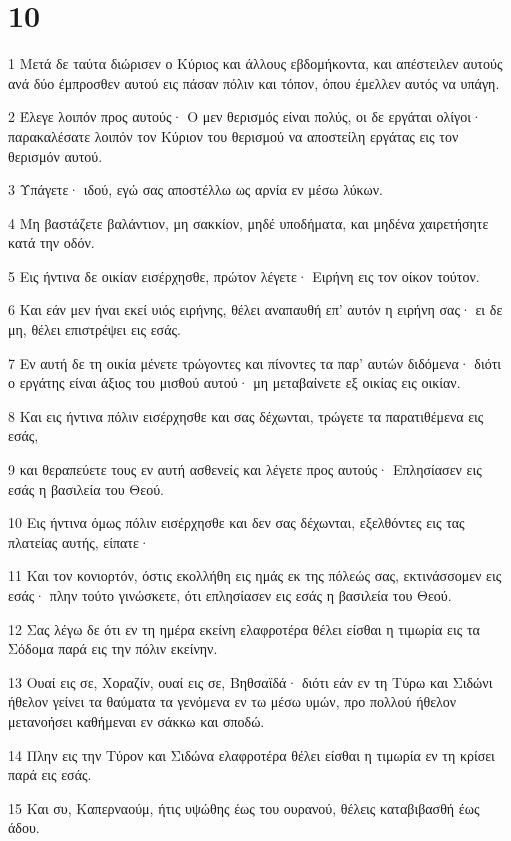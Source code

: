 \chapter{10}

\par 1 Μετά δε ταύτα διώρισεν ο Κύριος και άλλους εβδομήκοντα, και απέστειλεν αυτούς ανά δύο έμπροσθεν αυτού εις πάσαν πόλιν και τόπον, όπου έμελλεν αυτός να υπάγη.
\par 2 Έλεγε λοιπόν προς αυτούς· Ο μεν θερισμός είναι πολύς, οι δε εργάται ολίγοι· παρακαλέσατε λοιπόν τον Κύριον του θερισμού να αποστείλη εργάτας εις τον θερισμόν αυτού.
\par 3 Υπάγετε· ιδού, εγώ σας αποστέλλω ως αρνία εν μέσω λύκων.
\par 4 Μη βαστάζετε βαλάντιον, μη σακκίον, μηδέ υποδήματα, και μηδένα χαιρετήσητε κατά την οδόν.
\par 5 Εις ήντινα δε οικίαν εισέρχησθε, πρώτον λέγετε· Ειρήνη εις τον οίκον τούτον.
\par 6 Και εάν μεν ήναι εκεί υιός ειρήνης, θέλει αναπαυθή επ' αυτόν η ειρήνη σας· ει δε μη, θέλει επιστρέψει εις εσάς.
\par 7 Εν αυτή δε τη οικία μένετε τρώγοντες και πίνοντες τα παρ' αυτών διδόμενα· διότι ο εργάτης είναι άξιος του μισθού αυτού· μη μεταβαίνετε εξ οικίας εις οικίαν.
\par 8 Και εις ήντινα πόλιν εισέρχησθε και σας δέχωνται, τρώγετε τα παρατιθέμενα εις εσάς,
\par 9 και θεραπεύετε τους εν αυτή ασθενείς και λέγετε προς αυτούς· Επλησίασεν εις εσάς η βασιλεία του Θεού.
\par 10 Εις ήντινα όμως πόλιν εισέρχησθε και δεν σας δέχωνται, εξελθόντες εις τας πλατείας αυτής, είπατε·
\par 11 Και τον κονιορτόν, όστις εκολλήθη εις ημάς εκ της πόλεώς σας, εκτινάσσομεν εις εσάς· πλην τούτο γινώσκετε, ότι επλησίασεν εις εσάς η βασιλεία του Θεού.
\par 12 Σας λέγω δε ότι εν τη ημέρα εκείνη ελαφροτέρα θέλει είσθαι η τιμωρία εις τα Σόδομα παρά εις την πόλιν εκείνην.
\par 13 Ουαί εις σε, Χοραζίν, ουαί εις σε, Βηθσαϊδά· διότι εάν εν τη Τύρω και Σιδώνι ήθελον γείνει τα θαύματα τα γενόμενα εν τω μέσω υμών, προ πολλού ήθελον μετανοήσει καθήμεναι εν σάκκω και σποδώ.
\par 14 Πλην εις την Τύρον και Σιδώνα ελαφροτέρα θέλει είσθαι η τιμωρία εν τη κρίσει παρά εις εσάς.
\par 15 Και συ, Καπερναούμ, ήτις υψώθης έως του ουρανού, θέλεις καταβιβασθή έως άδου.
